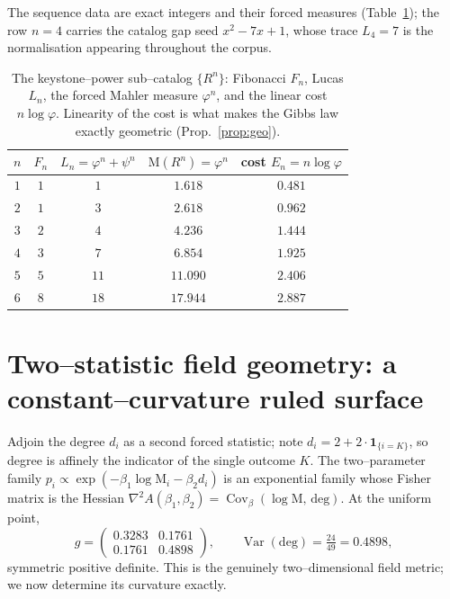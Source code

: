 \documentclass[11pt]{article}
\theoremstyle{definition}
\newcommand{\ph}{\varphi}
\newcommand{\Mah}{\mathrm{M}}
\newcommand{\Var}{\operatorname{Var}}
\newcommand{\Cov}{\operatorname{Cov}}
\begin{document}
The sequence data are exact integers and their forced measures (Table~\ref{tab:keystone}); the row
$n=4$ carries the catalog gap seed $x^2-7x+1$, whose trace $L_4=7$ is the normalisation appearing
throughout the corpus.

\begin{table}[h]\centering
\begin{tabular}{ccccc}
\toprule
$n$ & $F_n$ & $L_n=\ph^n+\psi^n$ & $\Mah(R^n)=\ph^n$ & cost $E_n=n\log\ph$\\ \midrule
$1$ & $1$ & $1$ & $1.618$ & $0.481$\\
$2$ & $1$ & $3$ & $2.618$ & $0.962$\\
$3$ & $2$ & $4$ & $4.236$ & $1.444$\\
$4$ & $3$ & $7$ & $6.854$ & $1.925$\\
$5$ & $5$ & $11$ & $11.090$ & $2.406$\\
$6$ & $8$ & $18$ & $17.944$ & $2.887$\\
\bottomrule
\end{tabular}
\caption{The keystone--power sub--catalog $\{R^n\}$: Fibonacci $F_n$, Lucas $L_n$, the forced Mahler
measure $\ph^n$, and the linear cost $n\log\ph$. Linearity of the cost is what makes the Gibbs law
exactly geometric (Prop.~\ref{prop:geo}).}\label{tab:keystone}
\end{table}

\section{Two--statistic field geometry: a constant--curvature ruled surface}
Adjoin the degree $d_i$ as a second forced statistic; note $d_i=2+2\cdot\mathbf 1_{\{i=K\}}$, so
degree is affinely the indicator of the single outcome $K$. The two--parameter family
$p_i\propto\exp(-\beta_1\log\Mah_i-\beta_2 d_i)$ is an exponential family whose Fisher matrix is the
Hessian $\nabla^2 A(\beta_1,\beta_2)=\Cov_\beta(\log\Mah,\,\mathrm{deg})$. At the uniform point,
\[
g=\begin{pmatrix}0.3283 & 0.1761\\[1pt] 0.1761 & 0.4898\end{pmatrix},\qquad
\Var(\mathrm{deg})=\tfrac{24}{49}=0.4898,
\]
symmetric positive definite. This is the genuinely two--dimensional field metric; we now determine
its curvature exactly.
\end{document}
